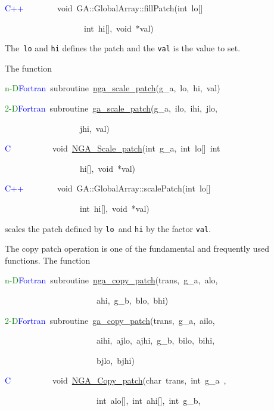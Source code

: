 \textcolor{blue}{C++}~~~~~~~~void~GA::GlobalArray::fillPatch(int~lo{[}{]}~

~~~~~~~~~~~~~~~~~~~int~hi{[}{]},~void~{*}val)

The\texttt{ lo} and \texttt{hi} defines the patch and the \texttt{val}
is the value to set.

The function

\textcolor{green}{n-D}\textcolor{blue}{Fortran}~subroutine~\href{https://hpc.pnl.gov/globalarrays/api/f_op_api.html\#ga_scale_patch}{nga\_{}scale\_{}patch}(g\_a,~lo,~hi,~val)~

\textcolor{green}{2-D}\textcolor{blue}{Fortran}~subroutine~\href{https://hpc.pnl.gov/globalarrays/api/f_op_api.html\#ga_scale_patch}{ga\_{}scale\_{}patch}(g\_a,~ilo,~ihi,~jlo,~

~~~~~~~~~~~~~~~~~~jhi,~val)~

\textcolor{blue}{C}~~~~~~~~~~void~\href{https://hpc.pnl.gov/globalarrays/api/c_op_api.html\#ga_scale_patch}{NGA\_{}Scale\_{}patch}(int~g\_a,~int~lo{[}{]}~int~

~~~~~~~~~~~~~~~~~~hi{[}{]},~void~{*}val)~

\textcolor{blue}{C++}~~~~~~~~void~GA::GlobalArray::scalePatch(int~lo{[}{]}~

~~~~~~~~~~~~~~~~~~int~hi{[}{]},~void~{*}val)

scales the patch defined by \texttt{lo }and \texttt{hi} by the factor
\texttt{val}.

The copy patch operation is one of the fundamental and frequently
used functions. The function

\textcolor{green}{n-D}\textcolor{blue}{Fortran}~subroutine~\href{https://hpc.pnl.gov/globalarrays/api/f_op_api.html\#ga_copy_patch}{nga\_{}copy\_{}patch}(trans,~g\_a,~alo,~

~~~~~~~~~~~~~~~~~~~~~~ahi,~g\_b,~blo,~bhi)~

\textcolor{green}{2-D}\textcolor{blue}{Fortran}~subroutine~\href{https://hpc.pnl.gov/globalarrays/api/f_op_api.html\#ga_copy_patch}{ga\_{}copy\_{}patch}(trans,~g\_a,~ailo,~

~~~~~~~~~~~~~~~~~~~~~~aihi,~ajlo,~ajhi,~g\_b,~bilo,~bihi,~

~~~~~~~~~~~~~~~~~~~~~~bjlo,~bjhi)~

\textcolor{blue}{C~}~~~~~~~~~void~\href{https://hpc.pnl.gov/globalarrays/api/c_op_api.html\#ga_copy_patch}{NGA\_{}Copy\_{}patch}(char~trans,~int~g\_a~,~

~~~~~~~~~~~~~~~~~~~~~~int~alo{[}{]},~int~ahi{[}{]},~int~g\_b,~

